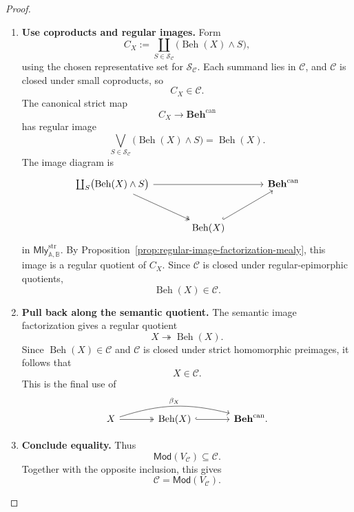 \begin{proof}
\begin{enumerate}
        \item \textbf{Use coproducts and regular images.}
        Form
        \[
            C_X:=
            \coprod_{S\in\mathcal S_{\mathcal C}}
            \bigl(\operatorname{Beh}(X)\wedge S\bigr),
        \]
        using the chosen representative set for
        \(\mathcal S_{\mathcal C}\). Each summand lies in \(\mathcal C\), and
        \(\mathcal C\) is closed under small coproducts, so
        \[
            C_X\in\mathcal C.
        \]
        The canonical strict map
        \[
            C_X\to\mathbf{Beh}^{\mathrm{can}}
        \]
        has regular image
        \[
            \bigvee_{S\in\mathcal S_{\mathcal C}}
            \bigl(\operatorname{Beh}(X)\wedge S\bigr)
            =
            \operatorname{Beh}(X).
        \]
        The image diagram is
        \[
        \begin{tikzcd}[column sep=large, row sep=large]
            \coprod_S\bigl(\operatorname{Beh}(X)\wedge S\bigr)
                \arrow[rr]
                \arrow[dr, two heads]
            &&
            \mathbf{Beh}^{\mathrm{can}}
            \\
            &
            \operatorname{Beh}(X)
                \arrow[ur, hook]
            &
        \end{tikzcd}
        \]
        in \(\mathsf{Mly}^{\mathrm{str}}_{\mathbb A,\mathbb B}\).
        By Proposition~\ref{prop:regular-image-factorization-mealy}, this image
        is a regular quotient of \(C_X\). Since \(\mathcal C\) is closed under
        regular-epimorphic quotients,
        \[
            \operatorname{Beh}(X)\in\mathcal C.
        \]

        \item \textbf{Pull back along the semantic quotient.}
        The semantic image factorization gives a regular quotient
        \[
            X\twoheadrightarrow\operatorname{Beh}(X).
        \]
        Since \(\operatorname{Beh}(X)\in\mathcal C\) and \(\mathcal C\) is
        closed under strict homomorphic preimages, it follows that
        \[
            X\in\mathcal C.
        \]
        This is the final use of
        \[
        \begin{tikzcd}[column sep=large, row sep=large]
            X
                \arrow[r, two heads]
                \arrow[rr, bend left=16, "\beta_X"]
            &
            \operatorname{Beh}(X)
                \arrow[r, hook]
            &
            \mathbf{Beh}^{\mathrm{can}} .
        \end{tikzcd}
        \]

        \item \textbf{Conclude equality.}
        Thus
        \[
            \mathsf{Mod}(V_{\mathcal C})\subseteq\mathcal C.
        \]
        Together with the opposite inclusion, this gives
        \[
            \mathcal C=\mathsf{Mod}(V_{\mathcal C}).
        \]
    \end{enumerate}
\end{proof}

